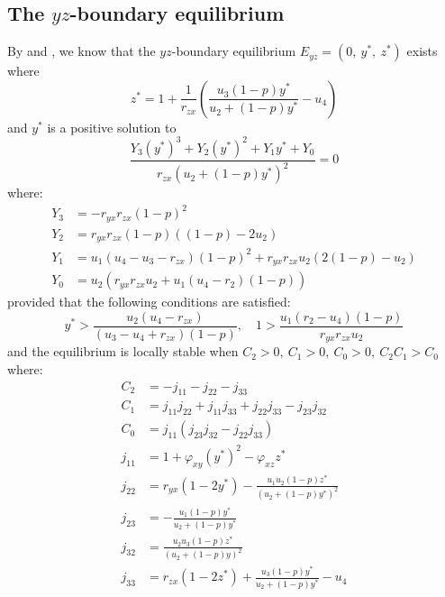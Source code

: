 \subsection{The $yz$-boundary equilibrium}\label{subsec:numsim_yz_boundary_equilibrium}
By  and , we know that the $yz$-boundary equilibrium $E_{yz}=\left(0,\ y^*,\ z^*\right)$ exists where
\begin{equation*}
    z^*=1+\frac{1}{r_{zx}}\left(\frac{u_3\left(1-p\right)y^*}{u_2+\left(1-p\right)y^*}-u_4\right)
\end{equation*}
and $y^*$ is a positive solution to 
\begin{equation*}
    \frac{Y_3\left(y^*\right)^3+Y_2\left(y^*\right)^2+Y_1y^*+Y_0}{r_{zx}\left(u_2+\left(1-p\right)y^*\right)^2}=0
\end{equation*}
where:
\begin{align*}
    Y_3 &= -r_{yx}r_{zx}\left(1-p\right)^2\\
    Y_2 &= r_{yx}r_{zx}\left(1-p\right)\left(\left(1-p\right)-2u_2\right)\\
    Y_1 &= u_1\left(u_4-u_3-r_{zx}\right)\left(1-p\right)^2+r_{yx}r_{zx}u_2\left(2\left(1-p\right)-u_2\right)\\
    Y_0 &= u_2\left(r_{yx}r_{zx}u_2+u_1\left(u_4-r_2\right)\left(1-p\right)\right)
\end{align*}
provided that the following conditions are satisfied:
\begin{equation*}
    y^* > \frac{u_2\left(u_4-r_{zx}\right)}{\left(u_3-u_4+r_{zx}\right)\left(1-p\right)},\quad 
    1 > \frac{u_1\left(r_2-u_4\right)\left(1-p\right)}{r_{yx}r_{zx}u_2}
\end{equation*}
and the equilibrium is locally stable when $C_2>0,\ C_1>0,\ C_0>0,\ C_2C_1>C_0$ where:
\begin{align*}
    C_2 &= -j_{11}-j_{22}-j_{33}\\
    C_1 &= j_{11}j_{22}+j_{11}j_{33}+j_{22}j_{33}-j_{23}j_{32}\\
    C_0 &= j_{11}\left(j_{23}j_{32}-j_{22}j_{33}\right)\\
    j_{11} &= 1+\varphi_{xy}\left(y^*\right)^2-\varphi_{xz}z^*\\
    j_{22} &= r_{yx}\left(1-2y^*\right)-\frac{u_1u_2\left(1-p\right)z^*}{\left(u_2+\left(1-p\right)y^*\right)^2}\\
    j_{23} &= -\frac{u_1\left(1-p\right)y^*}{u_2+\left(1-p\right)y^*}\\
    j_{32} &= \frac{u_2u_3\left(1-p\right)z^*}{\left(u_2+\left(1-p\right)y\right)^2}\\
    j_{33} &= r_{zx}\left(1-2z^*\right)+\frac{u_3\left(1-p\right)y^*}{u_2+\left(1-p\right)y^*}-u_4
\end{align*}
